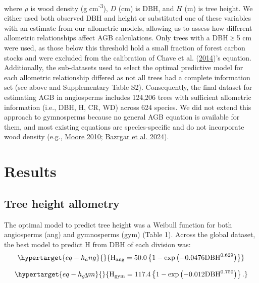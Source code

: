 \documentclass[
  12pt,
  letterpaper,
  DIV=11,
  numbers=noendperiod]{scrartcl}
\begin{document}
where \(\rho\) is wood density (g cm\textsuperscript{-3}), \(D\) (cm) is
DBH, and \(H\) (m) is tree height. We either used both observed DBH and
height or substituted one of these variables with an estimate from our
allometric models, allowing us to assess how different allometric
relationships affect AGB calculations. Only trees with a DBH ≥ 5 cm were
used, as those below this threshold hold a small fraction of forest
carbon stocks and were excluded from the calibration of Chave et al.
(\protect\hyperlink{ref-Chave2014}{2014})'s equation. Additionally, the
sub-datasets used to select the optimal predictive model for each
allometric relationship differed as not all trees had a complete
information set (see above and Supplementary Table S2). Consequently,
the final dataset for estimating AGB in angiosperms includes 124,206
trees with sufficient allometric information (i.e., DBH, H, CR, WD)
across 624 species. We did not extend this approach to gymnosperms
because no general AGB equation is available for them, and most existing
equations are species-specific and do not incorporate wood density
(e.g., \protect\hyperlink{ref-Moore2010}{Moore 2010};
\protect\hyperlink{ref-Bazrgar2024}{Bazrgar et al. 2024}).

\hypertarget{results}{%
\section{Results}\label{results}}

\hypertarget{tree-height-allometry}{%
\subsection{Tree height allometry}\label{tree-height-allometry}}

The optimal model to predict tree height was a Weibull function for both
angiosperms (ang) and gymnosperms (gym) (Table 1). Across the global
dataset, the best model to predict H from DBH of each division was:
\begin{equation}\protect\hypertarget{eq-h_ang}{}{
\mathrm{H_{ang}} =50.0
\left\{ 1 - \exp\left( - 0.0476
\mathrm{DBH}^{0.629}
\right) \right\}
}\label{eq-h_ang}\end{equation}

\begin{equation}\protect\hypertarget{eq-h_gym}{}{
\mathrm{H_{gym}} = 117.4
\left\{ 1 - \exp\left( - 0.012
\mathrm{DBH}^{0.750}
\right) \right\}.
}\label{eq-h_gym}\end{equation}
\end{document}
